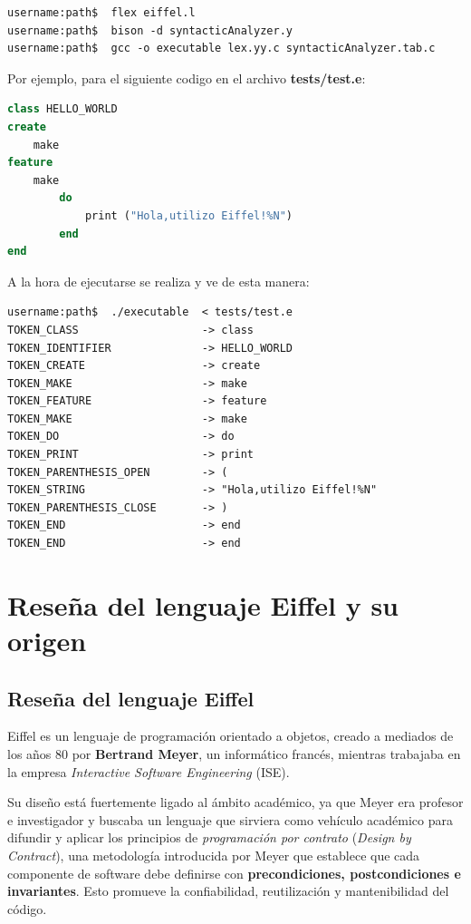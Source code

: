 \documentclass[a4paper,12pt]{article}
\begin{document}
\begin{lstlisting}[style=DOS]
username:path$  flex eiffel.l
username:path$  bison -d syntacticAnalyzer.y
username:path$  gcc -o executable lex.yy.c syntacticAnalyzer.tab.c
\end{lstlisting}

\vspace{4mm}
\noindent
Por ejemplo, para el siguiente codigo en el archivo \textbf{tests/test.e}:

\begin{lstlisting}[language=Eiffel, style=myeiffel]
class HELLO_WORLD
create
    make
feature
    make
        do
            print ("Hola,utilizo Eiffel!%N")
        end
end
\end{lstlisting}

\noindent
A la hora de ejecutarse se realiza y ve de esta manera:

\begin{lstlisting}[style=DOS]
username:path$  ./executable  < tests/test.e 
TOKEN_CLASS                   -> class
TOKEN_IDENTIFIER              -> HELLO_WORLD
TOKEN_CREATE                  -> create
TOKEN_MAKE                    -> make
TOKEN_FEATURE                 -> feature
TOKEN_MAKE                    -> make
TOKEN_DO                      -> do
TOKEN_PRINT                   -> print
TOKEN_PARENTHESIS_OPEN        -> (
TOKEN_STRING                  -> "Hola,utilizo Eiffel!%N"
TOKEN_PARENTHESIS_CLOSE       -> )
TOKEN_END                     -> end
TOKEN_END                     -> end
\end{lstlisting}

\vspace{6mm}
\section{Reseña del lenguaje Eiffel y su origen}
\vspace{4mm}

\subsection{Reseña del lenguaje Eiffel}

Eiffel es un lenguaje de programación orientado a objetos, creado a mediados de
los años 80 por \textbf{Bertrand Meyer}, un informático francés, mientras
trabajaba en la empresa \textit{Interactive Software Engineering} (ISE).

\noindent
Su diseño está fuertemente ligado al ámbito académico, ya que Meyer era
profesor e
investigador y buscaba un lenguaje que sirviera como vehículo académico para
difundir y aplicar los principios de \textit{programación por contrato}
(\textit{Design by Contract}), una metodología introducida por Meyer que
establece que cada componente de software debe definirse con
\textbf{precondiciones, postcondiciones e invariantes}. Esto promueve la
confiabilidad, reutilización y mantenibilidad del código.
\end{document}
